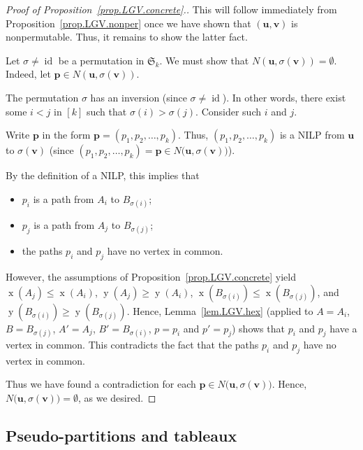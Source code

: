 \documentclass[reqno]{amsart}
\newcommand{\0}{\phantom{c}}
\newcommand{\SymGp}[1]{\mathfrak{S}_{#1}} %
\DeclareMathOperator{\xcoord}{x} %
\DeclareMathOperator{\ycoord}{y} %
\DeclareMathOperator{\id}{id} %
\newcommand{\pp}{\mathbf{p}}
\newcommand{\uu}{\mathbf{u}}
\newcommand{\vv}{\mathbf{v}}
\newenvironment{verlong}{}{}
\newcommand{\tup}[1]{\left( #1 \right)}
\newcommand{\ive}[1]{\left[ #1 \right]}
\theoremstyle{plain}
\theoremstyle{definition}
\numberwithin{equation}{section}
\begin{document}
\begin{verlong}
\begin{proof}
[Proof of Proposition~\ref{prop.LGV.concrete}.]This will follow immediately
from Proposition~\ref{prop.LGV.nonper} once we have shown that $\left(
\uu,\vv\right)  $ is nonpermutable. Thus, it remains to show the
latter fact.

Let $\sigma\neq\id$ be a permutation in $\SymGp{k}$. We
must show that $N\left(  \uu,\sigma\left(  \vv\right)  \right)
=\emptyset$. Indeed, let $\pp\in N\left(  \uu,\sigma\left(
\vv\right)  \right)  $.

The permutation $\sigma$ has an inversion (since $\sigma \neq \id$).
In other words, there exist some $i<j$ in $\ive{k}$ such that $\sigma(i) > \sigma(j)$.
Consider such $i$ and $j$.

Write $\pp$ in the form $\pp = \tup{p_1, p_2, \dotsc, p_k}$.
Thus, $\tup{p_1, p_2, \dotsc, p_k}$ is a NILP from $\uu$ to $\sigma(\vv)$ (since $\tup{p_1, p_2, \dotsc, p_k} = \pp\in N\bigl( \uu, \sigma(\vv) \bigr)$).

By the definition of a NILP, this implies that
\begin{itemize}
\item $p_i$ is a path from $A_i$ to $B_{\sigma(i)}$;

\item $p_j$ is a path from $A_j$ to $B_{\sigma(j)}$;

\item the paths $p_i$ and $p_j$ have no vertex in common.
\end{itemize}

However, the assumptions of Proposition~\ref{prop.LGV.concrete} yield
$\xcoord(A_j) \leq \xcoord(A_i)$,
$\ycoord(A_j) \geq \ycoord(A_i)$,
$\xcoord(B_{\sigma(i)}) \leq \xcoord(B_{\sigma(j)})$, and
$\ycoord(B_{\sigma(i)}) \geq \ycoord(B_{\sigma(j)})$.
Hence, Lemma~\ref{lem.LGV.hex} (applied to $A = A_i$, $B = B_{\sigma(j)}$, $A' = A_j$, $B' = B_{\sigma(i)}$, $p = p_i$ and $p' = p_j$) shows that $p_i$ and $p_j$ have a vertex in common.
This contradicts the fact that the paths $p_i$ and $p_j$ have no vertex in common.

Thus we have found a contradiction for each $\pp\in N\bigl( \uu,\sigma(\vv) \bigr)$.
Hence, $N\bigl(\uu, \sigma(\vv) \bigr) = \emptyset$, as we desired.
\end{proof}
\end{verlong}

\subsection{Pseudo-partitions and tableaux}
\end{document}
